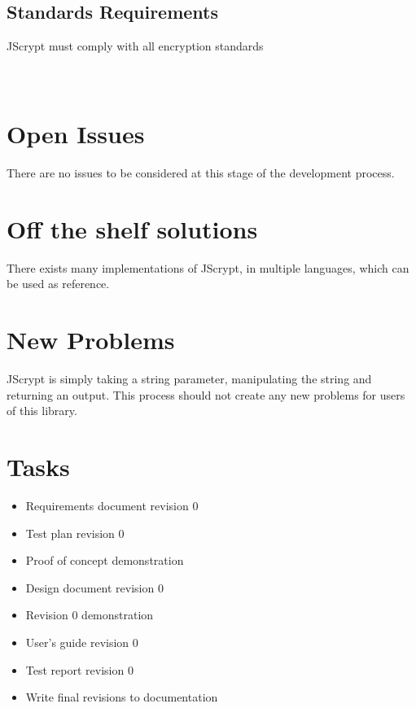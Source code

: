 \documentclass[12pt]{article}
\begin{document}
\subsection {Standards Requirements}
JScrypt must comply with all encryption standards \\ \\ \\

\section*{}

\section {Open Issues}
There are no issues to be considered at this stage of the development process.

\section {Off the shelf solutions}
There exists many implementations of JScrypt, in multiple languages, which can be used as reference.

\section {New Problems}
JScrypt is simply taking a string parameter, manipulating the string and returning an output. This process should not create any new problems for users of this library.

\section {Tasks}
\begin{itemize}
	\item Requirements document revision 0
	\item Test plan revision 0
	\item Proof of concept demonstration
	\item Design document revision 0
	\item Revision 0 demonstration
	\item User's guide revision 0
	\item Test report revision 0
	\item Write final revisions to documentation
	\end{itemize}
\end{document}
